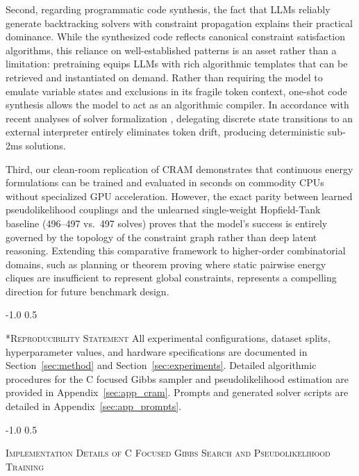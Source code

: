 \documentclass{article} %
\makeatletter
\renewcommand{\section}{\@startsection{section}{1}{\z@}%
  {-1.0\baselineskip}%
  {0.5\baselineskip}%
  {\normalfont\fontsize{12}{14}\selectfont\raggedright\scshape}}
\makeatother
\begin{document}
Second, regarding programmatic code synthesis, the fact that LLMs reliably generate backtracking solvers with constraint propagation explains their practical dominance. While the synthesized code reflects canonical constraint satisfaction algorithms, this reliance on well-established patterns is an asset rather than a limitation: pretraining equips LLMs with rich algorithmic templates that can be retrieved and instantiated on demand. Rather than requiring the model to emulate variable states and exclusions in its fragile token context, one-shot code synthesis allows the model to act as an algorithmic compiler. In accordance with recent analyses of solver formalization \citep{Chen2022ProgramThoughts, Amonkar2026SolverlikeBehavior}, delegating discrete state transitions to an external interpreter entirely eliminates token drift, producing deterministic sub-2ms solutions.

Third, our clean-room replication of CRAM demonstrates that continuous energy formulations can be trained and evaluated in seconds on commodity CPUs without specialized GPU acceleration. However, the exact parity between learned pseudolikelihood couplings and the unlearned single-weight Hopfield-Tank baseline (496--497 vs.\ 497 solves) proves that the model's success is entirely governed by the topology of the constraint graph rather than deep latent reasoning. Extending this comparative framework to higher-order combinatorial domains, such as planning or theorem proving where static pairwise energy cliques are insufficient to represent global constraints, represents a compelling direction for future benchmark design.

\section*{\textsc{Reproducibility Statement}}
All experimental configurations, dataset splits, hyperparameter values, and hardware specifications are documented in Section~\ref{sec:method} and Section~\ref{sec:experiments}. Detailed algorithmic procedures for the C focused Gibbs sampler and pseudolikelihood estimation are provided in Appendix~\ref{sec:app_cram}. Prompts and generated solver scripts are detailed in Appendix~\ref{sec:app_prompts}.




\clearpage
\appendix
\section{\textsc{Implementation Details of C Focused Gibbs Search and Pseudolikelihood Training}}
\label{sec:app_cram}
\end{document}
